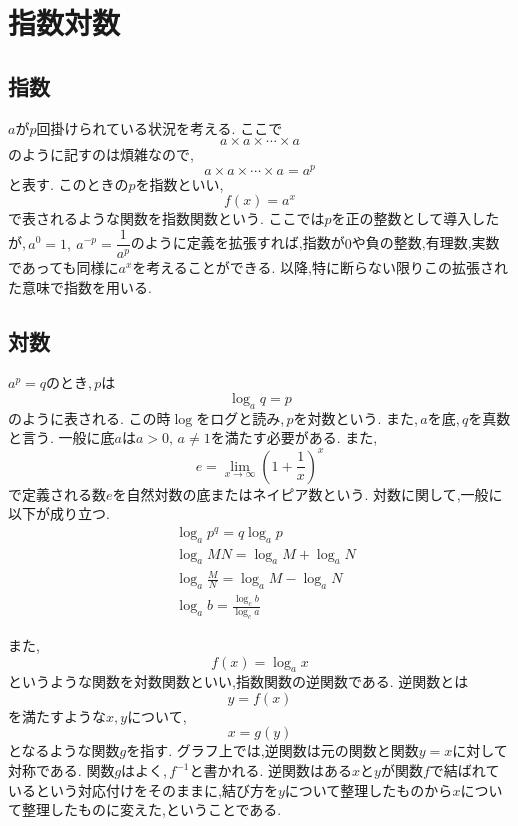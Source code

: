 
  \section{指数対数}
    \subsection{指数}
      $a$が$p$回掛けられている状況を考える.
      ここで
      \[
        a\times a\times\cdots\times a
      \]
      のように記すのは煩雑なので,
      \[
        a\times a\times\cdots\times a=a^p
      \]
      と表す.
      このときの$p$を指数といい,
      \[
        f(x)=a^x
      \]
      で表されるような関数を指数関数という.
      ここでは$p$を正の整数として導入したが,\,$a^0=1,\ a^{-p}=\dfrac1{a^p}$のように定義を拡張すれば,指数が$0$や負の整数,有理数,実数であっても同様に$a^x$を考えることができる.
      以降,特に断らない限りこの拡張された意味で指数を用いる.
    \subsection{対数}
      $a^p=q$のとき,\,$p$は
      \[
        \log_a{q}=p
      \]
      のように表される.
      この時$\log$をログと読み,\,$p$を対数という.
      また,\,$a$を底,\,$q$を真数と言う.
      一般に底$a$は$a>0,\,a\ne1$を満たす必要がある.
      また,
      \[
        e=\lim_{x \to \infty} \left(1+\frac{1}{x}\right)^x
      \]
      で定義される数$e$を自然対数の底またはネイピア数という.
      対数に関して,一般に以下が成り立つ.
      \begin{align*}
        &\log_a{p^q}=q\log_a{p}\\
        &\log_a{MN}=\log_a{M}+\log_a{N}\\
        &\log_a{\frac{M}{N}}=\log_a{M}-\log_a{N}\\
        &\log_a{b}=\frac{\log_c{b}}{\log_c{a}}
      \end{align*}
      
      また,
      \[
        f(x)=\log_a x
      \]
      というような関数を対数関数といい,指数関数の逆関数である.
      逆関数とは
      \[
        y=f(x)
      \]
      を満たすような$x,y$について,
      \[
        x=g(y)
      \]
      となるような関数$g$を指す.
      グラフ上では,逆関数は元の関数と関数$y=x$に対して対称である.
      関数$g$はよく,\,$f^{-1}$と書かれる.
      逆関数はある$x$と$y$が関数$f$で結ばれているという対応付けをそのままに,結び方を$y$について整理したものから$x$について整理したものに変えた,ということである.


    
